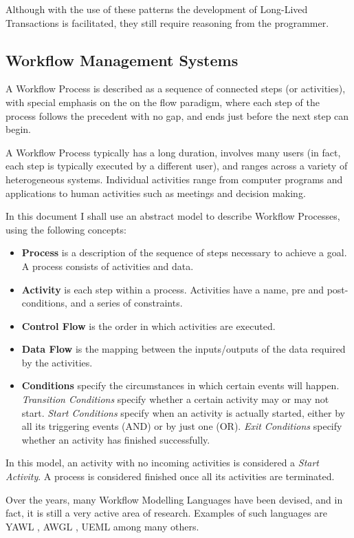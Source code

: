 \documentclass{llncs}
\begin{document}
Although with the use of these patterns the development of Long-Lived
Transactions is facilitated, they still require reasoning from the
programmer.

\subsection{Workflow Management Systems}

A Workflow Process is described as a sequence of connected steps (or
activities), with special emphasis on the on the flow paradigm, where
each step of the process follows the precedent with no gap, and ends
just before the next step can begin.

A Workflow Process typically has a long duration, involves many users
(in fact, each step is typically executed by a different user), and
ranges across a variety of heterogeneous systems. Individual
activities range from computer programs and applications to human
activities such as meetings and decision making.

In this document I shall use an abstract model to describe Workflow
Processes, using the following concepts:
\begin{itemize}
\item {\bf Process} is a description of the sequence of steps
  necessary to achieve a goal. A process consists of activities and
  data.
\item {\bf Activity} is each step within a process. Activities have a
  name, pre and post-conditions, and a series of constraints.
\item {\bf Control Flow} is the order in which activities are
  executed.
\item {\bf Data Flow} is the mapping between the inputs/outputs of the
  data required by the activities.
\item {\bf Conditions} specify the circumstances in which certain
  events will happen. {\it Transition Conditions} specify whether a
  certain activity may or may not start. {\it Start Conditions}
  specify when an activity is actually started, either by all its
  triggering events (AND) or by just one (OR). {\it Exit Conditions}
  specify whether an activity has finished successfully.
\end{itemize}
In this model, an activity with no incoming activities is considered a
{\it Start Activity}. A process is considered finished once all its
activities are terminated.

Over the years, many Workflow Modelling Languages have been devised,
and in fact, it is still a very active area of research. Examples of
such languages are YAWL \cite{van2005yawl}, AWGL
\cite{fahringer2005specification}, UEML \cite{vernadat2002ueml} among
many others.
\end{document}
